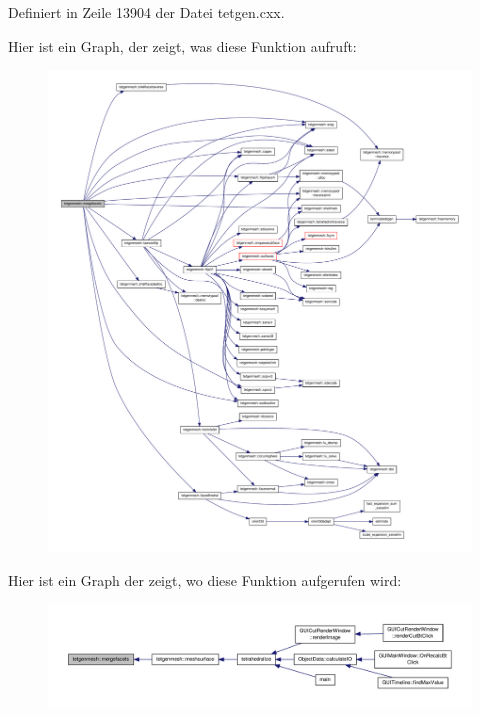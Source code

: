 Definiert in Zeile 13904 der Datei tetgen.\-cxx.



Hier ist ein Graph, der zeigt, was diese Funktion aufruft\-:\nopagebreak
\begin{figure}[H]
\begin{center}
\leavevmode
\includegraphics[width=350pt]{classtetgenmesh_a5abff2e7fa8ae0632729d11f61c9f2a8_cgraph}
\end{center}
\end{figure}




Hier ist ein Graph der zeigt, wo diese Funktion aufgerufen wird\-:\nopagebreak
\begin{figure}[H]
\begin{center}
\leavevmode
\includegraphics[width=350pt]{classtetgenmesh_a5abff2e7fa8ae0632729d11f61c9f2a8_icgraph}
\end{center}
\end{figure}


